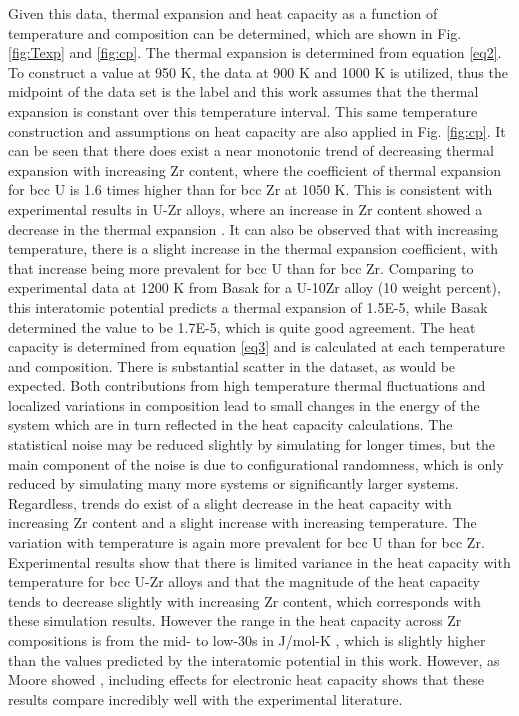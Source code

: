 \documentclass[review]{elsarticle}
\begin{document}
Given this data, thermal expansion and heat capacity as a function of temperature and composition can be determined, which are shown in Fig. \ref{fig:Texp} and \ref{fig:cp}. The thermal expansion is determined from equation \ref{eq2}. To construct a value at 950 K, the data at 900 K and 1000 K is utilized, thus the midpoint of the data set is the label and this work assumes that the thermal expansion is constant over this temperature interval. This same temperature construction and assumptions on heat capacity are also applied in Fig. \ref{fig:cp}. It can be seen that there does exist a near monotonic trend of decreasing thermal expansion with increasing Zr content, where the coefficient of thermal expansion for bcc U is 1.6 times higher than for bcc Zr at 1050 K. This is consistent with experimental results in U-Zr alloys, where an increase in Zr content showed a decrease in the thermal expansion \cite{touloukian1975}. It can also be observed that with increasing temperature, there is a slight increase in the thermal expansion coefficient, with that increase being more prevalent for bcc U than for bcc Zr. Comparing to experimental data at 1200 K from Basak \cite{basak2009} for a U-10Zr alloy (10 weight percent), this interatomic potential predicts a thermal expansion of 1.5E-5, while Basak determined the value to be 1.7E-5, which is quite good agreement. The heat capacity is determined from equation \ref{eq3} and is calculated at each temperature and composition.  There is substantial scatter in the dataset, as would be expected. Both contributions from high temperature thermal fluctuations and localized variations in composition lead to small changes in the energy of the system which are in turn reflected in the heat capacity calculations. The statistical noise may be reduced slightly by simulating for longer times, but the main component of the noise is due to configurational randomness, which is only reduced by simulating many more systems or significantly larger systems. Regardless, trends do exist of a slight decrease in the heat capacity with increasing Zr content and a slight increase with increasing temperature. The variation with temperature is again more prevalent for bcc U than for bcc Zr. Experimental results show that there is limited variance in the heat capacity with temperature for bcc U-Zr alloys and that the magnitude of the heat capacity tends to decrease slightly with increasing Zr content, which corresponds with these simulation results. However the range in the heat capacity across Zr compositions is from the mid- to low-30s in J/mol-K \cite{janney2018}, which is slightly higher than the values predicted by the interatomic potential in this work. However, as Moore showed \cite{moore2015}, including effects for electronic heat capacity shows that these results compare incredibly well with the experimental literature. 
\end{document}
